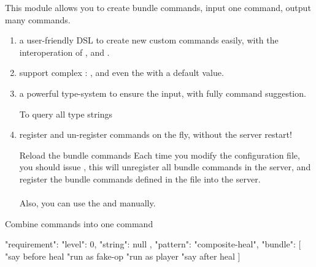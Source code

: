 \label{ch:command_bundle}

This module allows you to create bundle commands, input one command, output many commands.


\begin{enumerate}
    \item {a user-friendly DSL to create new custom commands easily, with the interoperation of ,  and .}
    \item {support complex : ,  and even the  with a default value.
    }
    \item {a powerful type-system to ensure the  input, with fully command suggestion.
        \begin{tips}{To query all type strings}
        \end{tips}
    }
    \item {register and un-register commands on the fly, without the server restart!
    \begin{example}{Reload the bundle commands}
        Each time you modify the configuration file, you should issue , this will unregister all bundle commands in the server, and register the bundle commands defined in the file into the server.\\\\
        Also, you can use the  and  manually.
    \end{example}

    }
\end{enumerate}

\begin{example}{Combine commands into one command}
    \begin{json}
    {
        "requirement": {
        "level": 0,
        "string": null
    },
        "pattern": "composite-heal",
        "bundle": [
        "say before heal %
        "run as fake-op %
        "run as player %
        "say after heal %
        ]
    }
    \end{json}
\end{example}


